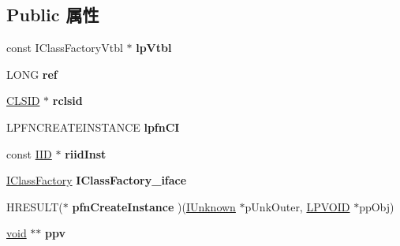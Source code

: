 \subsection*{Public 属性}
\begin{DoxyCompactItemize}
\item 
\mbox{\label{struct_i_class_factory_impl_aa77d0acb39f03468e055ca3e6cc02608}} 
const I\+Class\+Factory\+Vtbl $\ast$ {\bfseries lp\+Vtbl}
\item 
\mbox{\label{struct_i_class_factory_impl_a3c543240fd53d0b7352bdc22dae79b5a}} 
L\+O\+NG {\bfseries ref}
\item 
\mbox{\label{struct_i_class_factory_impl_aded2d3351b98dd53fafdebc7e77b0e80}} 
\hyperlink{struct___i_i_d}{C\+L\+S\+ID} $\ast$ {\bfseries rclsid}
\item 
\mbox{\label{struct_i_class_factory_impl_a5467c5ffddd425feb2b232930da38f16}} 
L\+P\+F\+N\+C\+R\+E\+A\+T\+E\+I\+N\+S\+T\+A\+N\+CE {\bfseries lpfn\+CI}
\item 
\mbox{\label{struct_i_class_factory_impl_a9b5f21c90c1fdf750bfd1a1c93dfec7d}} 
const \hyperlink{struct___i_i_d}{I\+ID} $\ast$ {\bfseries riid\+Inst}
\item 
\mbox{\label{struct_i_class_factory_impl_a98af98821959d6cacc6e264ee35ef1d9}} 
\hyperlink{interface_i_class_factory}{I\+Class\+Factory} {\bfseries I\+Class\+Factory\+\_\+iface}
\item 
\mbox{\label{struct_i_class_factory_impl_a63a1b423f17a0126673aba43ce85b1d5}} 
H\+R\+E\+S\+U\+LT($\ast$ {\bfseries pfn\+Create\+Instance} )(\hyperlink{interface_i_unknown}{I\+Unknown} $\ast$p\+Unk\+Outer, \hyperlink{interfacevoid}{L\+P\+V\+O\+ID} $\ast$pp\+Obj)
\item 
\mbox{\label{struct_i_class_factory_impl_af3efea8fbdd0ffe7d04c3df072577832}} 
\hyperlink{interfacevoid}{void} $\ast$$\ast$ {\bfseries ppv}
\item 
\mbox{\label{struct_i_class_factory_impl_a94c06c28c1576d4accbff7b824d1bc70}} 
$$
\end{DoxyCompactItemize}
